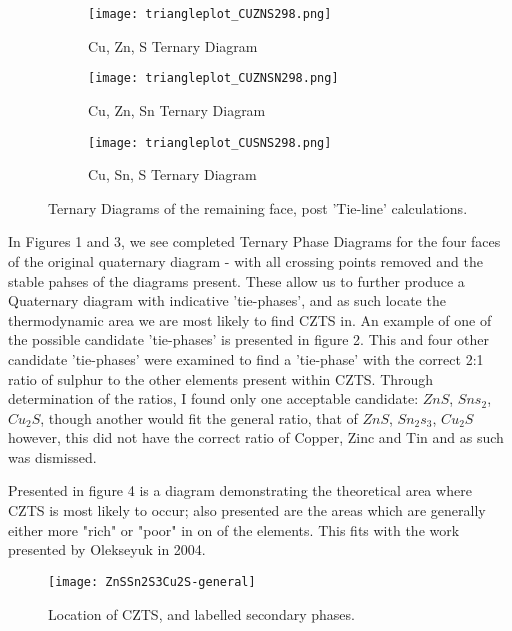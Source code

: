 \begin{figure}
\centering
\begin{subfigure}{80mm}
  \centering
    \texttt{[image: triangleplot\_CUZNS298.png]}
    \caption{Cu, Zn, S Ternary Diagram}
    \label{fig:CuZnS}
\end{subfigure}%
\begin{subfigure}{80mm}
 \centering
    \texttt{[image: triangleplot\_CUZNSN298.png]}
    \caption{Cu, Zn, Sn Ternary Diagram}
    \label{fig:CuZnSn}
\end{subfigure}
\begin{subfigure}{80mm}
 \centering
    \texttt{[image: triangleplot\_CUSNS298.png]}
    \caption{Cu, Sn, S Ternary Diagram}
    \label{fig:CuSnS}
\end{subfigure}
\caption{Ternary Diagrams of the remaining face, post 'Tie-line' calculations.}
\label{fig:RemainingFaces}
\end{figure}

In Figures 1 and 3, we see completed Ternary Phase Diagrams for the four faces of the original quaternary diagram - with all crossing points removed and the stable pahses of the diagrams present.
These allow us to further produce a Quaternary diagram with indicative 'tie-phases', and as such locate the thermodynamic area we are most likely to find CZTS in. An example of one of the possible candidate 'tie-phases' is presented in figure 2. This and four other candidate 'tie-phases' were examined to find a 'tie-phase' with the correct 2:1 ratio of sulphur to the other elements present within CZTS. Through determination of the ratios, I found only one acceptable candidate: $ZnS$, $Sns_2$, $Cu_2S$, though another would fit the general ratio, that of $ZnS$, $Sn_2s_3$, $Cu_2S$ however, this did not have the correct ratio of Copper, Zinc and Tin and as such was dismissed.

Presented in figure 4 is a diagram demonstrating the theoretical area where CZTS is most likely to occur; also presented are the areas which are generally either more "rich" or "poor" in on of the elements. This fits with the work presented by Olekseyuk in 2004.\citep{Olekseyuk2004}

\begin{figure}
\centering
 \texttt{[image: ZnSSn2S3Cu2S-general]}
    \caption{Location of CZTS, and labelled secondary phases.}
    \label{fig:ZnSSn2S3Cu2S}
\end{figure}
